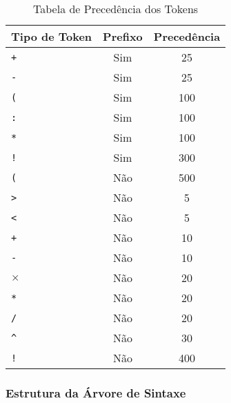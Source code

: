 \begin{table}[h!]
\centering
\begin{tabular}{|l|c|c|}
\hline
\textbf{Tipo de Token} & \textbf{Prefixo} & \textbf{Precedência}\\ \hline
\texttt{+}            & Sim              & 25                   \\ \hline
\texttt{-}            & Sim              & 25                   \\ \hline
\texttt{(}            & Sim              & 100                  \\ \hline
\texttt{:}            & Sim              & 100                  \\ \hline
\texttt{*}            & Sim              & 100                  \\ \hline
\texttt{!}            & Sim              & 300                  \\ \hline
\texttt{(}            & Não              & 500                  \\ \hline
\texttt{>}            & Não              & 5                    \\ \hline
\texttt{<}            & Não              & 5                    \\ \hline
\texttt{+}            & Não              & 10                   \\ \hline
\texttt{-}            & Não              & 10                   \\ \hline
$\times$              & Não              & 20                   \\ \hline
\texttt{*}            & Não              & 20                   \\ \hline
\texttt{/}            & Não              & 20                   \\ \hline
\texttt{\textasciicircum} & Não           & 30                  \\ \hline
\texttt{!}            & Não              & 400                  \\ \hline
\end{tabular}
\caption{Tabela de Precedência dos Tokens}
\label{tab-token-precedence}
\end{table}


\subsubsection{Estrutura da Árvore de Sintaxe}

